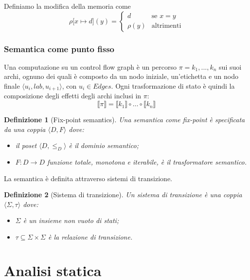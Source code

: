 \documentclass[a4paper, 11pt]{article}
\newtheorem{definit}{Definizione}[subsection]
\begin{document}
	Definiamo la modifica della memoria come \[ \rho \lbrack x \mapsto d \rbrack (y) = \begin{cases}
	d &\text{se } x = y \\
	\rho(y) &\text{altrimenti}
	\end{cases} \]
	
	\subsubsection{Semantica come punto fisso}
	
	Una computazione su un control flow graph è un percorso $\pi = k_1, ..., k_n$ sui suoi archi, ognuno dei quali è composto da un nodo iniziale, un'etichetta e un nodo finale $\langle u_i, lab, u_{i+1} \rangle$, con $u_i \in Edges$. Ogni trasformazione di stato è quindi la composizione degli effetti degli archi inclusi in $\pi$:
	\[ \llbracket \pi \rrbracket = \llbracket  k_1 \rrbracket \circ \dots \circ \llbracket k_n \rrbracket \]
	
	\begin{definit}[Fix-point semantics]
		Una semantica come fix-point è specificata da una coppia $\langle D,F \rangle$ dove: \begin{itemize}
		\item il poset $\langle D, \leq_D \rangle $ è il dominio semantico; 
		\item $F: D \to D $ funzione totale, monotona e iterabile, è il trasformatore semantico.
	\end{itemize}
	\end{definit}

	La semantica è definita attraverso sistemi di transizione.
	\begin{definit}[Sistema di transizione]
		Un sistema di transizione è una coppia $\langle \Sigma, \tau \rangle$ dove: \begin{itemize}
			\item $\Sigma$ è un insieme non vuoto di stati;
			\item $\tau \subseteq \Sigma \times \Sigma$ è la relazione di transizione.
		\end{itemize}
	\end{definit}

	\section{Analisi statica}
	
	
	
	
	
	
	
	
	
	
	
	
	
\end{document}
